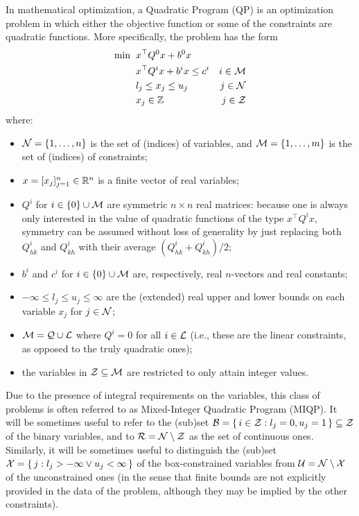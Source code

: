 In mathematical optimization, a Quadratic Program (QP) is an optimization problem in which either the objective function or some of the constraints are quadratic functions. More specifically, the problem has the form
%
\begin{align*}	
 \min \;\;
 & x^\top Q^0 x + b^0 x \\
 & x^\top Q^i x + b^i x \leq c^i & i \in \mathcal{M} \\ 
 & l_j \leq x_j \leq u_j & j \in \mathcal{N}  \\
 & x_j \in \mathbb{Z} & j \in \mathcal{Z}
\end{align*}
%
where:
%
\begin{itemize}
 \item $\mathcal{N} = \{ 1, \ldots, n \}$ is the set of (indices) of variables, and $\mathcal{M} = \{ 1, \ldots, m \}$ is the set of (indices) of constraints;
 \item $x = [x_j]_{j = 1}^n \in \mathbb{R}^n$ is a finite vector of real variables;
 \item $Q^i$ for $i \in \{ 0 \} \cup \mathcal{M}$ are symmetric $n \times n$ real matrices: because one is always only interested in the value of quadratic functions of the type $x^\top Q^i x$, symmetry can be assumed without loss of generality by just replacing both $Q^i_{hk}$ and $Q^i_{kh}$ with their average $(Q^i_{hk} + Q^i_{kh}) / 2$;
 \item $b^i$ and $c^i$ for $i \in \{ 0 \} \cup \mathcal{M}$ are, respectively, real $n$-vectors and real constants;
 \item $-\infty \leq l_j \leq u_j \leq \infty$ are the (extended) real upper and lower bounds on each variable $x_j$ for $j \in \mathcal{N}$;
 \item $\mathcal{M} = \mathcal{Q} \cup \mathcal{L}$ where $Q^i = 0$ for all $i \in \mathcal{L}$ (i.e., these are the linear constraints, as opposed to the truly quadratic ones);
 \item the variables in $\mathcal{Z} \subseteq \mathcal{M}$ are restricted to only attain integer values.
\end{itemize}
%
Due to the presence of integral requirements on the variables, this class of problems is often referred to as Mixed-Integer Quadratic Program (MIQP). It will be sometimes useful to refer to the (sub)set $\mathcal{B} =  \{ \, i \in \mathcal{Z} : l_j = 0 , u_j = 1 \, \} \subseteq \mathcal{Z}$ of the binary variables, and to $\mathcal{R} = \mathcal{N} \setminus \mathcal{Z}$ as the set of continuous ones. Similarly, it will be sometimes useful to distinguish the (sub)set $\mathcal{X} = \{ \, j : l_j > -\infty \lor u_j < \infty \, \}$ of the box-constrained variables from $\mathcal{U} = \mathcal{N} \setminus \mathcal{X}$ of the unconstrained ones (in the sense that finite bounds are not explicitly provided in the data of the problem, although they may be implied by the other constraints).

